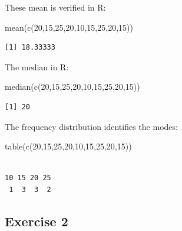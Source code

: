 \documentclass[
  letterpaper,
  DIV=11,
  numbers=noendperiod]{scrreprt}
\newenvironment{Shaded}{\begin{snugshade}}{\end{snugshade}}
\newcommand{\DecValTok}[1]{\textcolor[rgb]{0.68,0.00,0.00}{#1}}
\newcommand{\FunctionTok}[1]{\textcolor[rgb]{0.28,0.35,0.67}{#1}}
\newcommand{\NormalTok}[1]{\textcolor[rgb]{0.00,0.23,0.31}{#1}}
\begin{document}
These mean is verified in R:

\begin{Shaded}
\begin{Highlighting}[numbers=left,,]
\FunctionTok{mean}\NormalTok{(}\FunctionTok{c}\NormalTok{(}\DecValTok{20}\NormalTok{,}\DecValTok{15}\NormalTok{,}\DecValTok{25}\NormalTok{,}\DecValTok{20}\NormalTok{,}\DecValTok{10}\NormalTok{,}\DecValTok{15}\NormalTok{,}\DecValTok{25}\NormalTok{,}\DecValTok{20}\NormalTok{,}\DecValTok{15}\NormalTok{))}
\end{Highlighting}
\end{Shaded}

\begin{verbatim}
[1] 18.33333
\end{verbatim}

The median in R:

\begin{Shaded}
\begin{Highlighting}[numbers=left,,]
\FunctionTok{median}\NormalTok{(}\FunctionTok{c}\NormalTok{(}\DecValTok{20}\NormalTok{,}\DecValTok{15}\NormalTok{,}\DecValTok{25}\NormalTok{,}\DecValTok{20}\NormalTok{,}\DecValTok{10}\NormalTok{,}\DecValTok{15}\NormalTok{,}\DecValTok{25}\NormalTok{,}\DecValTok{20}\NormalTok{,}\DecValTok{15}\NormalTok{))}
\end{Highlighting}
\end{Shaded}

\begin{verbatim}
[1] 20
\end{verbatim}

The frequency distribution identifies the modes:

\begin{Shaded}
\begin{Highlighting}[numbers=left,,]
\FunctionTok{table}\NormalTok{(}\FunctionTok{c}\NormalTok{(}\DecValTok{20}\NormalTok{,}\DecValTok{15}\NormalTok{,}\DecValTok{25}\NormalTok{,}\DecValTok{20}\NormalTok{,}\DecValTok{10}\NormalTok{,}\DecValTok{15}\NormalTok{,}\DecValTok{25}\NormalTok{,}\DecValTok{20}\NormalTok{,}\DecValTok{15}\NormalTok{))}
\end{Highlighting}
\end{Shaded}

\begin{verbatim}

10 15 20 25 
 1  3  3  2 
\end{verbatim}

\hypertarget{exercise-2-5}{%
\subsection*{Exercise 2}\label{exercise-2-5}}
\end{document}
